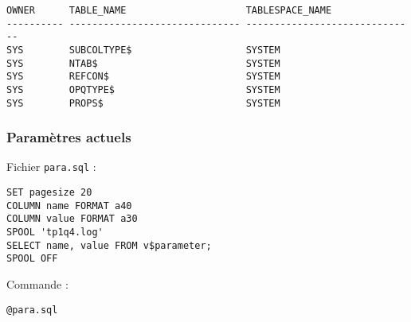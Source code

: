 \begin{verbatim}
OWNER      TABLE_NAME                     TABLESPACE_NAME                       
---------- ------------------------------ ------------------------------        
SYS        SUBCOLTYPE$                    SYSTEM                                
SYS        NTAB$                          SYSTEM                                
SYS        REFCON$                        SYSTEM                                
SYS        OPQTYPE$                       SYSTEM                                
SYS        PROPS$                         SYSTEM                             
\end{verbatim}

\subsubsection{Paramètres actuels}

Fichier \verb|para.sql| :
\begin{verbatim}
SET pagesize 20
COLUMN name FORMAT a40
COLUMN value FORMAT a30
SPOOL 'tp1q4.log'
SELECT name, value FROM v$parameter;
SPOOL OFF
\end{verbatim}

Commande :
\begin{verbatim}
@para.sql
\end{verbatim}

